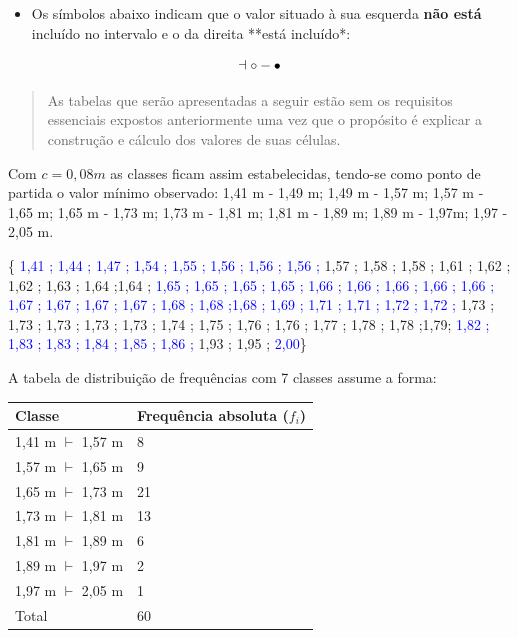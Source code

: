 \documentclass[
]{book}
\providecommand{\tightlist}{%
  \setlength{\itemsep}{0pt}\setlength{\parskip}{0pt}}
\begin{document}
\hfill\break

\begin{itemize}
\tightlist
\item
  Os símbolos abaixo indicam que o valor situado à sua esquerda \textbf{não está} incluído no intervalo e o da direita **está incluído*:
\end{itemize}

\hfill\break

\[
\dashv  \\
{\circ}-{\bullet}
\]

\hfill\break

\begin{quote}
As tabelas que serão apresentadas a seguir estão sem os requisitos essenciais expostos anteriormente uma vez que o propósito é explicar a construção e cálculo dos valores de suas células.
\end{quote}

\hfill\break

Com \(c=0,08m\) as classes ficam assim estabelecidas, tendo-se como ponto de partida o valor mínimo observado: 1,41 m - 1,49 m; 1,49 m - 1,57 m; 1,57 m - 1,65 m; 1,65 m - 1,73 m; 1,73 m - 1,81 m; 1,81 m - 1,89 m; 1,89 m - 1,97m; 1,97 - 2,05 m.

\hfill\break

\{
\textcolor{blue}{ 1,41 ; 1,44 ; 1,47 ; 1,54 ; 1,55 ; 1,56 ; 1,56 ; 1,56 ;} 1,57 ; 1,58 ; 1,58 ; 1,61 ; 1,62 ; 1,62 ; 1,63 ; 1,64 ;1,64 ; \textcolor{blue}{ 1,65 ; 1,65 ; 1,65 ; 1,65 ; 1,66 ; 1,66 ; 1,66 ; 1,66 ; 1,66 ; 1,67 ; 1,67 ; 1,67 ; 1,67 ; 1,68 ; 1,68 ;1,68 ; 1,69 ; 1,71 ; 1,71 ; 1,72 ; 1,72 ;} 1,73 ; 1,73 ; 1,73 ; 1,73 ; 1,73 ; 1,74 ; 1,75 ; 1,76 ; 1,76 ; 1,77 ; 1,78 ; 1,78 ;1,79; \textcolor{blue}{1,82 ; 1,83 ; 1,83 ; 1,84 ; 1,85 ; 1,86  ;} 1,93 ; 1,95 ; \textcolor{blue}{2,00}\}

\hfill\break

A tabela de distribuição de frequências com 7 classes assume a forma:

\hfill\break

\begin{longtable}[]{@{}ll@{}}
\toprule()
Classe & Frequência absoluta (\(f_{i}\)) \\
\midrule()
\endhead
1,41 m \(\vdash\) 1,57 m & 8 \\
1,57 m \(\vdash\) 1,65 m & 9 \\
1,65 m \(\vdash\) 1,73 m & 21 \\
1,73 m \(\vdash\) 1,81 m & 13 \\
1,81 m \(\vdash\) 1,89 m & 6 \\
1,89 m \(\vdash\) 1,97 m & 2 \\
1,97 m \(\vdash\) 2,05 m & 1 \\
Total & 60 \\
\bottomrule()
\end{longtable}
\end{document}
